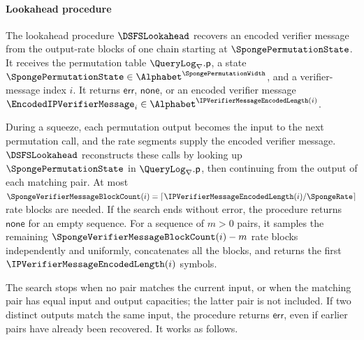 \paragraph{Lookahead procedure}

\begin{definition}[LookAhead]
\label{def:dsfs_lookahead}
\leanok
{}
The lookahead procedure \(\DSFSLookahead\) recovers an encoded verifier message from the output-rate blocks of one chain starting at \(\SpongePermutationState\). It receives the permutation table \(\QueryLog_{\nabla}.\mathsf p\), a state \(\SpongePermutationState\in\Alphabet^{\SpongePermutationWidth}\), and a verifier-message index \(i\). It returns \(\mathsf{err}\), \(\mathsf{none}\), or an encoded verifier message \(\EncodedIPVerifierMessage_i\in\Alphabet^{\IPVerifierMessageEncodedLength(i)}\).

During a squeeze, each permutation output becomes the input to the next permutation call, and the rate segments supply the encoded verifier message. \(\DSFSLookahead\) reconstructs these calls by looking up \(\SpongePermutationState\) in \(\QueryLog_{\nabla}.\mathsf p\), then continuing from the output of each matching pair. At most \(\SpongeVerifierMessageBlockCount(i)=\lceil\IPVerifierMessageEncodedLength(i)/\SpongeRate\rceil\) rate blocks are needed. If the search ends without error, the procedure returns \(\mathsf{none}\) for an empty sequence. For a sequence of \(m>0\) pairs, it samples the remaining \(\SpongeVerifierMessageBlockCount(i)-m\) rate blocks independently and uniformly, concatenates all the blocks, and returns the first \(\IPVerifierMessageEncodedLength(i)\) symbols.

The search stops when no pair matches the current input, or when the matching pair has equal input and output capacities; the latter pair is not included. If two distinct outputs match the same input, the procedure returns \(\mathsf{err}\), even if earlier pairs have already been recovered. It works as follows.


\end{definition}

